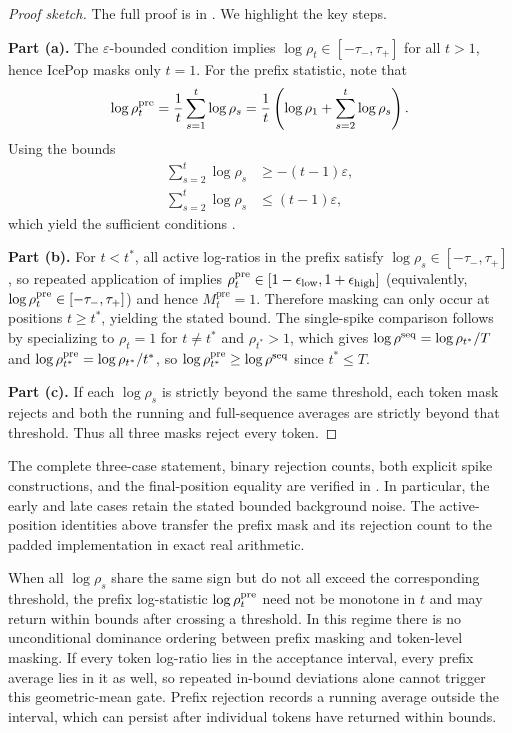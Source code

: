 \begin{proof}[Proof sketch]
The full proof is in . We highlight the key steps.

\textbf{Part (a).} The $\varepsilon$-bounded condition implies $\log\rho_t \in [-\tau_-, \tau_+]$ for all $t>1$, hence IcePop masks
only $t=1$. For the prefix statistic, note that
\begin{equation*}
    \log\rho_{t}^{\mathrm{pre}}
    = \frac{1}{t}\sum_{s=1}^{t} \log\rho_s
    = \frac{1}{t}\left(\log\rho_1+\sum_{s=2}^{t}\log\rho_s\right).
\end{equation*}
Using the bounds
\begin{align*}
    \sum_{s=2}^{t}\log\rho_s &\ge -(t-1)\varepsilon,
    \\
    \sum_{s=2}^{t}\log\rho_s &\le (t-1)\varepsilon,
\end{align*}
which yield the sufficient conditions .

\textbf{Part (b).} For $t<t^*$, all active log-ratios in the prefix satisfy $\log\rho_s\in[-\tau_-,\tau_+]$, so repeated
application of  implies $\rho_{t}^{\mathrm{pre}}\in[1-\epsilon_{\mathrm{low}},1+\epsilon_{\mathrm{high}}]$ (equivalently,
$\log\rho_{t}^{\mathrm{pre}}\in[-\tau_-,\tau_+]$) and hence
$M_t^{\mathrm{pre}}=1$. Therefore masking can only occur at positions $t\ge t^*$, yielding the stated bound. The single-spike
comparison follows by specializing to $\rho_t=1$ for $t\neq t^*$ and $\rho_{t^*}>1$, which gives $\log\rho^{\mathrm{seq}}=\log\rho_{t^*}/T$ and
$\log\rho_{t^*}^{\mathrm{pre}}=\log\rho_{t^*}/t^*$, so $\log\rho_{t^*}^{\mathrm{pre}}\ge \log\rho^{\mathrm{seq}}$ since $t^*\le T$.

\textbf{Part (c).} If each $\log\rho_s$ is strictly beyond the same threshold, each token mask rejects and both the running and
full-sequence averages are strictly beyond that threshold. Thus all three masks reject every token.
\end{proof}

The complete three-case statement, binary rejection counts, both explicit
spike constructions, and the final-position equality are verified in
. In particular, the early and late cases
retain the stated bounded background noise. The active-position identities
above transfer the prefix mask and its rejection count to the padded
implementation in exact real arithmetic.

\begin{remark}
When all $\log\rho_s$ share the same sign but do not all exceed the corresponding threshold, the prefix log-statistic $\log\rho_{t}^{\mathrm{pre}}$ need not be
monotone in $t$ and may return within bounds after crossing a threshold. In this regime there is no unconditional dominance ordering
between prefix masking and token-level masking. If every token log-ratio lies in the acceptance interval, every prefix average lies
in it as well, so repeated in-bound deviations alone cannot trigger this geometric-mean gate.
Prefix rejection records a running average outside the interval, which can persist after individual tokens have returned within bounds.
\end{remark}


